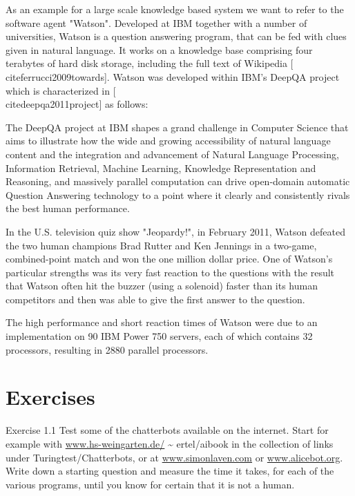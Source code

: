 \documentclass[10pt]{book}
\begin{document}
As an example for a large scale knowledge based system we want to refer to the software agent "Watson". Developed at IBM together with a number of universities, Watson is a question answering program, that can be fed with clues given in natural language. It works on a knowledge base comprising four terabytes of hard disk storage, including the full text of Wikipedia [\\cite{ferrucci2009towards}]. Watson was developed within IBM's DeepQA project which is characterized in [\\cite{deepqa2011project}] as follows:

\begin{displayquote}
The DeepQA project at IBM shapes a grand challenge in Computer Science that aims to illustrate how the wide and growing accessibility of natural language content and the integration and advancement of Natural Language Processing, Information Retrieval, Machine Learning, Knowledge Representation and Reasoning, and massively parallel computation can drive open-domain automatic Question Answering technology to a point where it clearly and consistently rivals the best human performance.
\end{displayquote}

In the U.S. television quiz show "Jeopardy!", in February 2011, Watson defeated the two human champions Brad Rutter and Ken Jennings in a two-game, combined-point match and won the one million dollar price. One of Watson's particular strengths was its very fast reaction to the questions with the result that Watson often hit the buzzer (using a solenoid) faster than its human competitors and then was able to give the first answer to the question.

The high performance and short reaction times of Watson were due to an implementation on 90 IBM Power 750 servers, each of which contains 32 processors, resulting in 2880 parallel processors.

\section{Exercises}
Exercise 1.1 Test some of the chatterbots available on the internet. Start for example with \href{http://www.hs-weingarten.de/}{www.hs-weingarten.de/} \~{} ertel/aibook in the collection of links under Turingtest/Chatterbots, or at \href{http://www.simonlaven.com}{www.simonlaven.com} or \href{http://www.alicebot.org}{www.alicebot.org}. Write down a starting question and measure the time it takes, for each of the various programs, until you know for certain that it is not a human.
\end{document}
